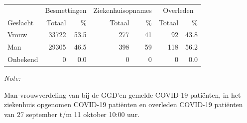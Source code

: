 \documentclass[
  english,
  man,floatsintext]{apa6}
\begin{document}
\begin{table}[H]
\centering\begingroup\fontsize{11}{13}\selectfont

\begin{threeparttable}
\begin{tabular}{lrrrrrr}
\toprule
\multicolumn{1}{c}{ } & \multicolumn{2}{c}{Besmettingen} & \multicolumn{2}{c}{Ziekenhuisopnames} & \multicolumn{2}{c}{Overleden} \\
\cmidrule(l{3pt}r{3pt}){2-3} \cmidrule(l{3pt}r{3pt}){4-5} \cmidrule(l{3pt}r{3pt}){6-7}
Geslacht & Totaal & \% & Totaal & \% & Totaal & \%\\
\midrule
Vrouw & 33722 & 53.5 & 277 & 41 & 92 & 43.8\\
Man & 29305 & 46.5 & 398 & 59 & 118 & 56.2\\
Onbekend & 0 & 0.0 & 0 & 0 & 0 & 0.0\\
\bottomrule
\end{tabular}
\begin{tablenotes}
\item \textit{Note: } 
\item Man-vrouwverdeling van bij de GGD’en gemelde COVID-19 patiënten, in het ziekenhuis opgenomen COVID-19 patiënten en overleden COVID-19 patiënten van 27 september t/m 11 oktober 10:00 uur.
\end{tablenotes}
\end{threeparttable}
\endgroup{}
\end{table}
\newpage
\end{document}
